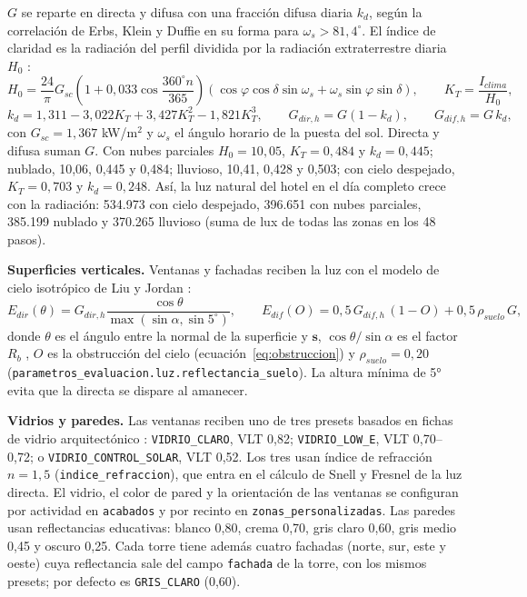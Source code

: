 \documentclass[12pt,a4paper]{article}
\newcommand{\clase}[1]{\texttt{#1}}
\newcommand{\codigo}[1]{\texttt{#1}}
\begin{document}
$G$ se reparte en directa y difusa con una fracción difusa diaria $k_d$, según la correlación de Erbs, Klein y Duffie \cite{erbs1982} en su forma para $\omega_s>81,4^\circ$. El índice de claridad es la radiación del perfil dividida por la radiación extraterrestre diaria $H_0$ \cite[ec.~1.10.3]{duffieBeckman}:
\begin{equation}
 H_0=\frac{24}{\pi}G_{sc}\left(1+0,033\cos\frac{360^\circ n}{365}\right)\left(\cos\varphi\cos\delta\sin\omega_s+\omega_s\sin\varphi\sin\delta\right),\qquad
 K_T=\frac{I_{clima}}{H_0},
 \label{eq:extraterrestre}
\end{equation}
\begin{equation}
 k_d=1,311-3,022K_T+3,427K_T^2-1,821K_T^3,\qquad
 G_{dir,h}=G(1-k_d),\qquad G_{dif,h}=G\,k_d,
 \label{eq:difusa}
\end{equation}
con $G_{sc}=1,367$ kW/m$^2$ y $\omega_s$ el ángulo horario de la puesta del sol. Directa y difusa suman $G$. Con nubes parciales $H_0=10,05$, $K_T=0,484$ y $k_d=0,445$; nublado, 10,06, 0,445 y 0,484; lluvioso, 10,41, 0,428 y 0,503; con cielo despejado, $K_T=0,703$ y $k_d=0,248$. Así, la luz natural del hotel en el día completo crece con la radiación: 534.973 con cielo despejado, 396.651 con nubes parciales, 385.199 nublado y 370.265 lluvioso (suma de lux de todas las zonas en los 48 pasos).

\textbf{Superficies verticales.} Ventanas y fachadas reciben la luz con el modelo de cielo isotrópico de Liu y Jordan \cite{liuJordan1960}:
\begin{equation}
 E_{dir}(\theta)=G_{dir,h}\frac{\cos\theta}{\max(\sin\alpha,\sin5^\circ)},\qquad
 E_{dif}(O)=0,5\,G_{dif,h}\,(1-O)+0,5\,\rho_{suelo}\,G,
 \label{eq:vertical}
\end{equation}
donde $\theta$ es el ángulo entre la normal de la superficie y $\mathbf s$, $\cos\theta/\sin\alpha$ es el factor $R_b$ \cite{duffieBeckman}, $O$ es la obstrucción del cielo (ecuación~\ref{eq:obstruccion}) y $\rho_{suelo}=0,20$ (\codigo{parametros\_evaluacion.luz.reflectancia\_suelo}). La altura mínima de 5° evita que la directa se dispare al amanecer.

\textbf{Vidrios y paredes.} Las ventanas reciben uno de tres presets basados en fichas de vidrio arquitectónico \cite{cardinalSolarControl,cardinalClear}: \clase{VIDRIO\_CLARO}, VLT 0,82; \clase{VIDRIO\_LOW\_E}, VLT 0,70--0,72; o \clase{VIDRIO\_CONTROL\_SOLAR}, VLT 0,52. Los tres usan índice de refracción $n=1,5$ (\codigo{indice\_refraccion}), que entra en el cálculo de Snell y Fresnel de la luz directa. El vidrio, el color de pared y la orientación de las ventanas se configuran por actividad en \codigo{acabados} y por recinto en \codigo{zonas\_personalizadas}. Las paredes usan reflectancias educativas: blanco 0,80, crema 0,70, gris claro 0,60, gris medio 0,45 y oscuro 0,25. Cada torre tiene además cuatro fachadas (norte, sur, este y oeste) cuya reflectancia sale del campo \codigo{fachada} de la torre, con los mismos presets; por defecto es \codigo{GRIS\_CLARO} (0,60).
\end{document}
